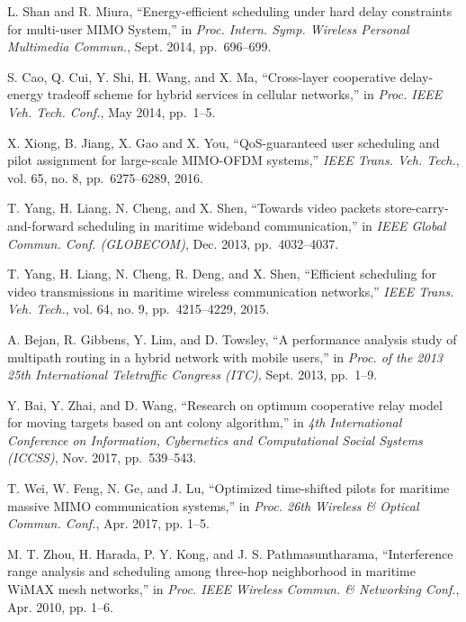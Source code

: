 \documentclass[conference]{IEEEtran}
\begin{document}
\begin{thebibliography}{10}
  L. Shan and R. Miura, ``Energy-efficient scheduling under hard delay constraints for multi-user MIMO System,'' in
  \emph{Proc. Intern. Symp. Wireless Personal Multimedia Commun.}, Sept. 2014, pp.~696--699.
  
  S. Cao, Q. Cui, Y. Shi, H. Wang, and X. Ma, ``Cross-layer cooperative delay-energy tradeoff scheme for hybrid services in cellular networks,'' in
  \emph{Proc. IEEE Veh. Tech. Conf.}, May 2014, pp.~1--5.
  
  X. Xiong, B. Jiang, X. Gao and X. You, ``QoS-guaranteed user scheduling and pilot assignment for large-scale MIMO-OFDM systems,''
  \emph{IEEE Trans. Veh. Tech.}, vol. 65, no. 8, pp.~6275--6289, 2016.
  
  
 
  T. Yang, H. Liang, N. Cheng, and X. Shen, 
  ``Towards video packets store-carry-and-forward scheduling in maritime wideband communication,'' in
  \emph{IEEE Global Commun. Conf. (GLOBECOM)}, Dec. 2013, pp.~4032--4037.
 
  T. Yang, H. Liang, N. Cheng, R. Deng, and X. Shen, ``Efficient scheduling for video transmissions in maritime wireless communication networks,'' 
  \emph{IEEE Trans. Veh. Tech.}, vol. 64, no. 9, pp.~4215--4229, 2015.
 
  A. Bejan, R. Gibbens, Y. Lim, and D. Towsley, 
  ``A performance analysis study of multipath routing in a hybrid network with mobile users,'' in 
  \emph{Proc. of the 2013 25th International Teletraffic Congress (ITC)}, Sept. 2013, pp.~1--9.
 
  Y. Bai, Y. Zhai, and D. Wang, 
  ``Research on optimum cooperative relay model for moving targets based on ant colony algorithm,'' in
  \emph{4th International Conference on Information, Cybernetics and Computational Social Systems (ICCSS)}, Nov. 2017, pp.~539--543.
 
 
  T. Wei, W. Feng, N. Ge, and J. Lu, ``Optimized time-shifted pilots for maritime massive MIMO communication systems,'' in
  \emph{Proc. 26th Wireless \& Optical Commun. Conf.}, Apr. 2017, pp. 1--5.
 
 
  M. T. Zhou, H. Harada, P. Y. Kong, and J. S. Pathmasuntharama, ``Interference range analysis and scheduling among three-hop neighborhood in maritime WiMAX mesh networks,'' in 
  \emph{Proc. IEEE Wireless Commun. \& Networking Conf.}, Apr. 2010, pp. 1--6.
 

\end{thebibliography}
\end{document}
